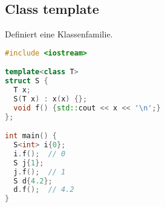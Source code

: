 \subsection{Class template}

Definiert eine Klassenfamilie.

\begin{lstlisting}[language=C++]
#include <iostream>

template<class T>
struct S {
  T x;
  S(T x) : x(x) {};
  void f() {std::cout << x << '\n';}
};

int main() {
  S<int> i{0};
  i.f();  // 0
  S j{1};
  j.f();  // 1
  S d{4.2};
  d.f();  // 4.2
}
\end{lstlisting}

